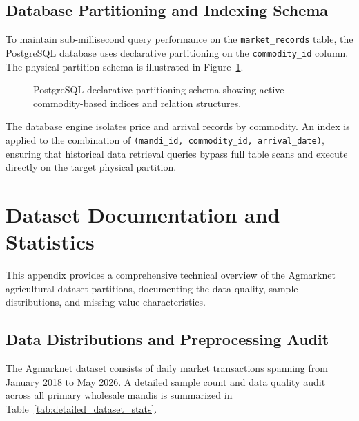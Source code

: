 \documentclass[12pt,a4paper]{report}
\theoremstyle{definition}
\theoremstyle{remark}
\begin{document}
\section{Database Partitioning and Indexing Schema}

To maintain sub-millisecond query performance on the \texttt{market\_records} table, the PostgreSQL database uses declarative partitioning on the \texttt{commodity\_id} column. The physical partition schema is illustrated in Figure~\ref{fig:db_partitioning}.

\begin{figure}[htbp]
    \centering
    \caption{PostgreSQL declarative partitioning schema showing active commodity-based indices and relation structures.}
    \label{fig:db_partitioning}
\end{figure}

The database engine isolates price and arrival records by commodity. An index is applied to the combination of \texttt{(mandi\_id, commodity\_id, arrival\_date)}, ensuring that historical data retrieval queries bypass full table scans and execute directly on the target physical partition.

\chapter{Dataset Documentation and Statistics}
\label{app:dataset_documentation}

This appendix provides a comprehensive technical overview of the Agmarknet agricultural dataset partitions, documenting the data quality, sample distributions, and missing-value characteristics.

\section{Data Distributions and Preprocessing Audit}

The Agmarknet dataset consists of daily market transactions spanning from January 2018 to May 2026. A detailed sample count and data quality audit across all primary wholesale mandis is summarized in Table~\ref{tab:detailed_dataset_stats}.
\end{document}
